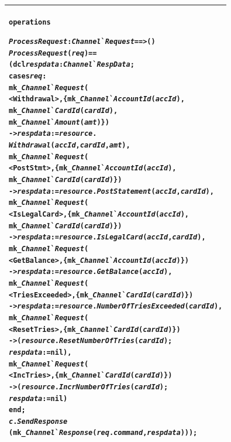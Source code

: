 \documentclass[\pformat,12pt,twoside]{article}
\newenvironment{VDMgray}%
{\begin{tabular}{|G|}\hline\small\begin{alltt}}%
{\end{alltt}\normalsize\\
 \hline\end{tabular}}
\begin{document}
\begin{VDMgray}
\textbf{operations}

 \textit{ProcessRequest} : \textit{Channel}\`{}\textit{Request} ==\texttt{>} ()
 \textit{ProcessRequest}(\textit{req}) ==
   (\textbf{dcl} \textit{respdata} : \textit{Channel}\`{}\textit{RespData};
    \textbf{cases} \textit{req}:
      \textbf{mk\_}\textit{Channel}\`{}\textit{Request}(
         \texttt{<}Withdrawal\texttt{>}, \{\textbf{mk\_}\textit{Channel}\`{}\textit{AccountId}(\textit{accId}),
                        \textbf{mk\_}\textit{Channel}\`{}\textit{CardId}(\textit{cardId}),
                        \textbf{mk\_}\textit{Channel}\`{}\textit{Amount}(\textit{amt})\})
       -\texttt{>} \textit{respdata} := \textit{resource}.
                              \textit{Withdrawal}(\textit{accId}, \textit{cardId}, \textit{amt}),
      \textbf{mk\_}\textit{Channel}\`{}\textit{Request}(
         \texttt{<}PostStmt\texttt{>}, \{\textbf{mk\_}\textit{Channel}\`{}\textit{AccountId}(\textit{accId}),
                      \textbf{mk\_}\textit{Channel}\`{}\textit{CardId}(\textit{cardId})\})
       -\texttt{>} \textit{respdata} := \textit{resource}.\textit{PostStatement}(\textit{accId}, \textit{cardId}),
      \textbf{mk\_}\textit{Channel}\`{}\textit{Request}(
         \texttt{<}IsLegalCard\texttt{>}, \{\textbf{mk\_}\textit{Channel}\`{}\textit{AccountId}(\textit{accId}),
                         \textbf{mk\_}\textit{Channel}\`{}\textit{CardId}(\textit{cardId})\})
       -\texttt{>} \textit{respdata} := \textit{resource}.\textit{IsLegalCard}(\textit{accId}, \textit{cardId}),
      \textbf{mk\_}\textit{Channel}\`{}\textit{Request}(
         \texttt{<}GetBalance\texttt{>}, \{\textbf{mk\_}\textit{Channel}\`{}\textit{AccountId}(\textit{accId})\})
       -\texttt{>} \textit{respdata} := \textit{resource}.\textit{GetBalance}(\textit{accId}),
      \textbf{mk\_}\textit{Channel}\`{}\textit{Request}(
         \texttt{<}TriesExceeded\texttt{>}, \{\textbf{mk\_}\textit{Channel}\`{}\textit{CardId}(\textit{cardId})\})
       -\texttt{>} \textit{respdata} := \textit{resource}.\textit{NumberOfTriesExceeded}(\textit{cardId}),
      \textbf{mk\_}\textit{Channel}\`{}\textit{Request}(
         \texttt{<}ResetTries\texttt{>}, \{\textbf{mk\_}\textit{Channel}\`{}\textit{CardId}(\textit{cardId})\})
       -\texttt{>} (\textit{resource}.\textit{ResetNumberOfTries}(\textit{cardId});
           \textit{respdata} := \textbf{nil}),
      \textbf{mk\_}\textit{Channel}\`{}\textit{Request}(
         \texttt{<}IncTries\texttt{>}, \{\textbf{mk\_}\textit{Channel}\`{}\textit{CardId}(\textit{cardId})\})
       -\texttt{>} (\textit{resource}.\textit{IncrNumberOfTries}(\textit{cardId});
           \textit{respdata} := \textbf{nil})
   \textbf{end};
   \textit{c}.\textit{SendResponse}
             (\textbf{mk\_}\textit{Channel}\`{}\textit{Response}(\textit{req}.\textit{command}, \textit{respdata})));
\end{VDMgray}
\end{document}
